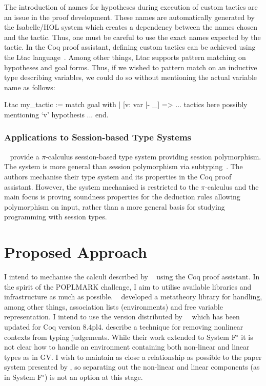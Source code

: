 \documentclass{mprop}
\newcommand{\fpop}{System F${}^\circ$\xspace}
\newcommand{\1}{\textbf{1}\xspace}
\begin{document}
The introduction of names for hypotheses during execution of custom tactics are an issue in the proof development. These names are automatically generated by the Isabelle/HOL system which creates a dependency between the names chosen and the tactic. Thus, one must be careful to use the exact names expected by the tactic. In the Coq proof assistant, defining custom tactics can be achieved using the Ltac language~\cite{Delahaye:2000:TLS}. Among other things, Ltac supports pattern matching on hypotheses and goal forms. Thus, if we wished to pattern match on an inductive type describing variables, we could do so without mentioning the actual variable name as follows:

\begin{coq}
Ltac my_tactic :=
  match goal with
  | [v: var |- _] => ... tactics here possibly mentioning `v' hypothesis ...
  end.
\end{coq}

\subsubsection{Applications to Session-based Type Systems}\label{sec:asts}

\citeauthor{Goto:2014}~\cite{Goto:2014} provide a $\pi$-calculus session-based type system providing session polymorphism. The system is more general than session polymorphism via subtyping~\cite{Gay:2005:SST}. The authors mechanise their type system and its properties in the Coq proof assistant. However, the system mechanised is restricted to the $\pi$-calculus and the main focus is proving soundness properties for the deduction rules allowing polymorphism on input, rather than a more general basis for studying programming with session types.

\section{Proposed Approach}\label{sec:approach}


I intend to mechanise the calculi described by \citeauthor{Wadler:2012}~\cite{Wadler:2012} using the Coq proof assistant. In the spirit of the POPLMARK challenge, I aim to utilise available libraries and infrastructure as much as possible. \citeauthor{Aydemir:2008:EFM}~\cite{Aydemir:2008:EFM} developed a metatheory library for handling, among other things, association lists (environments) and free variable representation. I intend to use the version distributed by~\citeauthor{Park:2014:MMW}~\cite{Park:2014:MMW} which has been updated for Coq version 8.4pl4. \citeauthor{Park:2014:MMW} describe a technique for removing nonlinear contexts from typing judgements. While their work extended to \fpop it is not clear how to handle an environment containing both non-linear and linear types as in GV. I wish to maintain as close a relationship as possible to the paper system presented by \citeauthor{Wadler:2012}, so separating out the non-linear and linear components (as in \fpop) is not an option at this stage.
\end{document}
